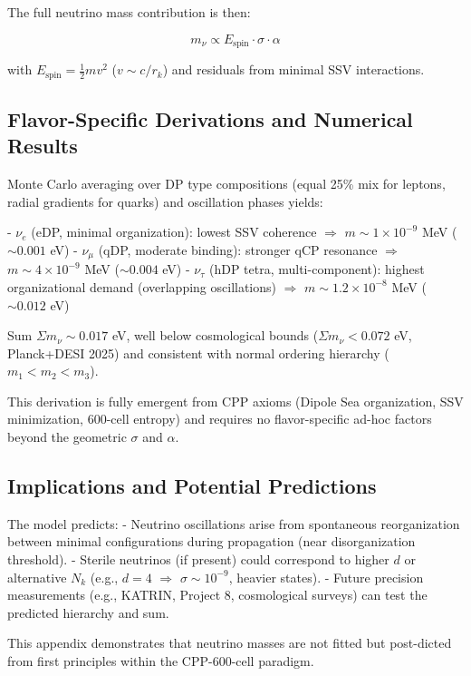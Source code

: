\documentclass{article}
\begin{document}
The full neutrino mass contribution is then:

\[
m_{\nu} \propto E_{\text{spin}} \cdot \sigma \cdot \alpha
\]

with $E_{\text{spin}} = \frac{1}{2} m v^2$ ($v \sim c / r_k$) and residuals from minimal SSV interactions.

\subsection{Flavor-Specific Derivations and Numerical Results}

Monte Carlo averaging over DP type compositions (equal 25\% mix for leptons, radial gradients for quarks) and oscillation phases yields:

- $\nu_e$ (eDP, minimal organization): lowest SSV coherence $\Rightarrow$ $m \sim 1 \times 10^{-9}$ MeV ($\sim 0.001$ eV)
- $\nu_\mu$ (qDP, moderate binding): stronger qCP resonance $\Rightarrow$ $m \sim 4 \times 10^{-9}$ MeV ($\sim 0.004$ eV)
- $\nu_\tau$ (hDP tetra, multi-component): highest organizational demand (overlapping oscillations) $\Rightarrow$ $m \sim 1.2 \times 10^{-8}$ MeV ($\sim 0.012$ eV)

Sum $\Sigma m_\nu \sim 0.017$ eV, well below cosmological bounds ($\Sigma m_\nu < 0.072$ eV, Planck+DESI 2025) and consistent with normal ordering hierarchy ($m_1 < m_2 < m_3$).

This derivation is fully emergent from CPP axioms (Dipole Sea organization, SSV minimization, 600-cell entropy) and requires no flavor-specific ad-hoc factors beyond the geometric $\sigma$ and $\alpha$.

\subsection{Implications and Potential Predictions}

The model predicts:
- Neutrino oscillations arise from spontaneous reorganization between minimal configurations during propagation (near disorganization threshold).
- Sterile neutrinos (if present) could correspond to higher $d$ or alternative $N_k$ (e.g., $d=4$ $\Rightarrow$ $\sigma \sim 10^{-9}$, heavier states).
- Future precision measurements (e.g., KATRIN, Project 8, cosmological surveys) can test the predicted hierarchy and sum.

This appendix demonstrates that neutrino masses are not fitted but post-dicted from first principles within the CPP-600-cell paradigm.
\end{document}
